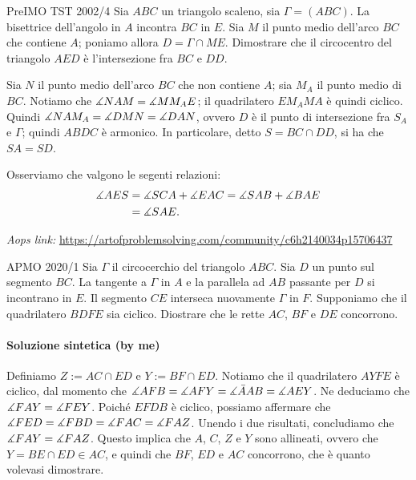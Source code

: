 \documentclass{article}
\begin{document}
\begin{proposition}{PreIMO TST 2002/4}{}
	Sia $ABC$ un triangolo scaleno, sia $\Gamma=(ABC)$.
	La bisettrice dell'angolo in $A$ incontra $BC$ in $E$. Sia
	$M$ il punto medio dell'arco $BC$ che contiene $A$;
	poniamo allora $D=\Gamma \cap ME$. Dimostrare che
	il circocentro del triangolo $AED$ è l'intersezione fra
	$BC$ e $DD$.
\end{proposition}

Sia $N$ il punto medio dell'arco $BC$ che non contiene $A$;
sia $M_A$ il punto medio di $BC$. Notiamo che $\measuredangle{NAM}=\measuredangle{MM_A E}$;
il quadrilatero $EM_A MA$ è quindi ciclico. Quindi $\measuredangle{NAM_A}=\measuredangle{DMN}
=\measuredangle{DAN}$, ovvero $D$ è il punto di intersezione fra $S_A$ e $\Gamma$;
quindi $ABDC$ è armonico. In particolare, detto $S=BC\cap DD$, si ha che
$SA=SD$.

Osserviamo che valgono le segenti relazioni:
\begin{align*}
	\measuredangle{AES}&=\measuredangle{SCA}+\measuredangle{EAC}=\measuredangle{SAB}+\measuredangle{BAE} \\
				 &=\measuredangle{SAE}.
\end{align*}


\vspace{0.5cm}
\textit{Aops link:}
\href{https://artofproblemsolving.com/community/c6h2140034p15706437}
{https://artofproblemsolving.com/community/c6h2140034p15706437}

\begin{proposition}{APMO 2020/1}{}
	Sia $\Gamma$ il circocerchio del triangolo $ABC$. Sia $D$ un punto sul
	segmento $BC$. La tangente a $\Gamma$ in $A$ e la parallela ad $AB$
	passante per $D$ si incontrano in $E$. Il segmento $CE$ interseca
	nuovamente $\Gamma$ in $F$. Supponiamo che il quadrilatero $BDFE$ sia
	ciclico. Diostrare che le rette $AC$, $BF$ e $DE$ concorrono.
\end{proposition}

\paragraph{Soluzione sintetica (by me)}
Definiamo $Z:=AC\cap ED$ e $Y:=BF\cap ED$. Notiamo che
il quadrilatero $AYFE$ è ciclico, dal momento che
$\measuredangle{AFB}=\measuredangle{AFY}=\measuredangle{\bar{A}AB}=\measuredangle{AEY}$.
Ne deduciamo che $\measuredangle{FAY}=\measuredangle{FEY}$.
Poiché $EFDB$ è ciclico, possiamo affermare che
$\measuredangle{FED}=\measuredangle{FBD}=\measuredangle{FAC}=\measuredangle{FAZ}$.
Unendo i due risultati, concludiamo che $\measuredangle{FAY}=\measuredangle{FAZ}$.
Questo implica che $A$, $C$, $Z$ e $Y$ sono allineati, ovvero che
$Y=BE\cap ED \in AC$, e quindi che $BF$, $ED$ e $AC$ concorrono,
che è quanto volevasi dimostrare.
\end{document}
